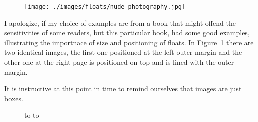 \begin{figure}[htbp]
\texttt{[image: ./images/floats/nude-photography.jpg]}
\caption{}
\label{fig:nude01}
\end{figure}

I apologize, if my choice of examples are from a book that might offend the sensitivities of some readers, but this particular book, had some good examples, illustrating the importnace of size and positioning of floats. In Figure~\ref{fig:nude01} there are two identical images, the first one positioned at the left outer margin and the other one at the right page is positioned on top and is lined with the outer margin.


\lipsum[1-5]

It is instructive at this point in time to remind ourselves that images are just boxes.
\begin{figure}[!b]
\expandafter\ifodd\thepage\relax
  \hbox to 
\else
  \hbox to 
\fi
\end{figure}


